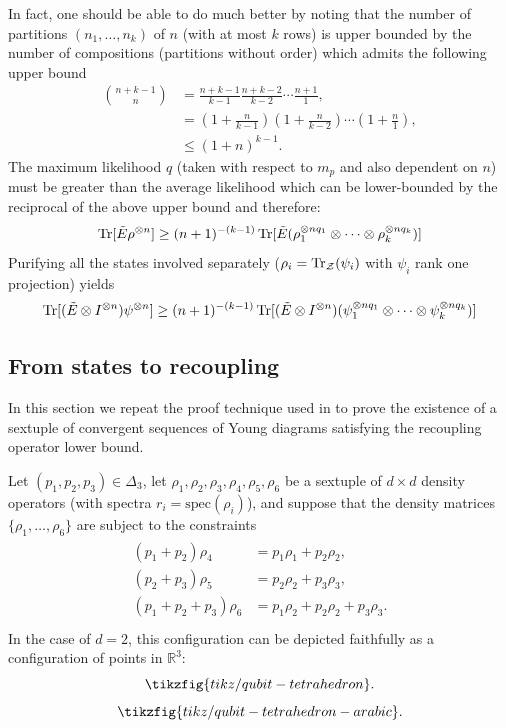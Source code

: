 \documentclass[notitlepage]{article}
\begin{document}
In fact, one should be able to do much better by noting that the number of partitions $(n_1, \ldots, n_k)$ of $n$ (with at most $k$ rows) is upper bounded by the number of compositions (partitions without order) which admits the following upper bound
\begin{align}
    \binom{n+k-1}{n} 
    &= \frac{n+k-1}{k-1}\frac{n+k-2}{k-2}\cdots\frac{n+1}{1}, \\
    &= \left(1+\frac{n}{k-1}\right)\left(1+\frac{n}{k-2}\right)\cdots\left(1+\frac{n}{1}\right), \\
    &\leq (1+n)^{k-1}.
\end{align}
The maximum likelihood $q$ (taken with respect to $m_p$ and also dependent on $n$) must be greater than the average likelihood which can be lower-bounded by the reciprocal of the above upper bound and therefore:
\begin{equation}
    \operatorname{Tr}[\tilde E \rho^{\otimes n}] \geq (n+1)^{-(k-1)}\operatorname{Tr}[\tilde E (\rho_1^{\otimes n q_1} \otimes \cdots \otimes \rho_k^{\otimes n q_k}) ]
\end{equation}
Purifying all the states involved separately ($\rho_i = \operatorname{Tr}_{\mathcal Z}(\psi_i)$ with $\psi_i$ rank one projection) yields
\begin{equation}
    \operatorname{Tr}[(\tilde E \otimes I^{\otimes n}) \psi^{\otimes n}] \geq (n+1)^{-(k-1)}\operatorname{Tr}[(\tilde E \otimes I^{\otimes n}) (\psi_1^{\otimes n q_1} \otimes \cdots \otimes \psi_k^{\otimes n q_k}) ]
\end{equation}

\subsection{From states to recoupling}

In this section we repeat the proof technique used in \cite{christandl2008quantum} to prove the existence of a sextuple of convergent sequences of Young diagrams satisfying the recoupling operator lower bound.

Let $(p_1, p_2, p_3) \in \Delta_3$, let $\rho_{1}, \rho_{2}, \rho_{3}, \rho_{4}, \rho_{5}, \rho_{6}$ be a sextuple of $d\times d$ density operators (with spectra $r_i = \mathrm{spec}(\rho_{i})$), and suppose that the density matrices $\{\rho_1, \ldots, \rho_6\}$ are subject to the constraints
\begin{align}
    \label{eq:sextuple_config_constraints}
    \begin{split}
        (p_1+p_2)\rho_{4} &= p_1 \rho_1 + p_2 \rho_2, \\
        (p_2+p_3)\rho_{5} &= p_2 \rho_2 + p_3 \rho_3, \\
        (p_1+p_2+p_3)\rho_{6} &= p_1 \rho_2 + p_2 \rho_2 + p_3 \rho_3. \\
    \end{split}
\end{align}
In the case of $d=2$, this configuration can be depicted faithfully as a configuration of points in $\mathbb R^{3}$:
\begin{equation}
    \tikzfig{tikz/qubit-tetrahedron}.
\end{equation}
\begin{equation}
    \tikzfig{tikz/qubit-tetrahedron-arabic}.
\end{equation}
\end{document}
